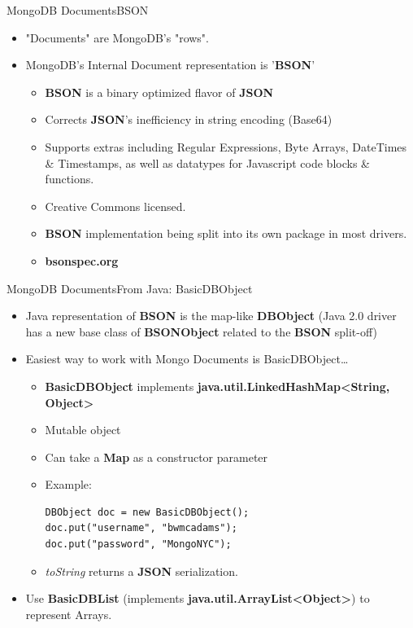 \documentclass{beamer}
\begin{document}
\begin{frame}{MongoDB Documents}{BSON}
    \begin{itemize}
        \item "Documents" are MongoDB's "rows". 
        \item MongoDB's Internal Document representation is '{\bf BSON}'
        \begin{itemize}
            \item {\bf BSON} is a binary optimized flavor of {\bf JSON}
            \item Corrects {\bf JSON}'s inefficiency in string encoding (Base64)
            \item Supports extras including Regular Expressions, Byte Arrays, DateTimes \& Timestamps, as well as datatypes for Javascript code blocks \& functions.
            \item Creative Commons licensed.
            \item {\bf BSON} implementation being split into its own package in most drivers.
            \item {\bf bsonspec.org}
        \end{itemize}
    \end{itemize}
\end{frame}

\begin{frame}[fragile]{MongoDB Documents}{From Java: BasicDBObject}
    \begin{itemize}
        \item Java representation of {\bf BSON} is the map-like {\bf DBObject} (Java 2.0 driver has a new base class of {\bf BSONObject} related to the {\bf BSON} split-off)
        \item Easiest way to work with Mongo Documents is BasicDBObject\dots
            \begin{itemize}
                \item<2-> {\bf BasicDBObject} implements {\bf java.util.LinkedHashMap<String, Object>}
                \item<3-> Mutable object
                \item<4-> Can take a {\bf Map} as a constructor parameter
                \item<5-> Example: 
                \begin{lstlisting}
DBObject doc = new BasicDBObject();
doc.put("username", "bwmcadams");
doc.put("password", "MongoNYC");
                \end{lstlisting}
                \item<6-> {\em toString} returns a {\bf JSON} serialization.
            \end{itemize}
        \item<7-> Use {\bf BasicDBList} (implements {\bf java.util.ArrayList<Object>}) to represent Arrays.
    \end{itemize}
\end{frame}
\end{document}
